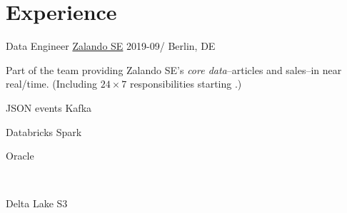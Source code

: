 \documentclass[%
version=last,%
fontsize=11pt,%
paper=A4,%
areasetadvanced,%
headinclude=false,%
footinclude=false,%
headlines=0,%
footlines=0,%
toc=bibnumbered,%
]{scrartcl}
\begin{document}
\begin{minipage}[t]{0.575\textwidth}
  \vspace*{0cm}%
  \section{Experience}%
  \label{sec:experience}

  \WorkEntry%
  {Data Engineer}%
  {\href{https://corporate.zalando.com/en}{Zalando SE}}%
  {2019-09/}%
  {Berlin, DE}%
  {%
    Part of the team providing Zalando SE’s \emph{core data}\---articles and
    sales\---in near real\-/time. (Including \(24 \times 7\) responsibilities
    starting .)%
    \vspace*{20pt}\newline%
    \begingroup%
    \begin{minipage}{.2\linewidth}
      \begin{tcolorbox}[title=Nakadi,remember as=Kafka]
        JSON events%
        \tcblower%
        Kafka
      \end{tcolorbox}
    \end{minipage}%
    \hfill%
    \begin{minipage}{.2\linewidth}
      \begin{tcolorbox}[title=AWS,remember as=Spark]
        Databricks%
        \tcblower%
        Spark
      \end{tcolorbox}%
    \end{minipage}%
    \hfill%
    \begin{minipage}{.2\linewidth}
      \begin{tcolorbox}[remember as=Oracle]
        Oracle
      \end{tcolorbox}%
      \\%
      \begin{tcolorbox}[remember as=S3]
        Delta Lake%
        \tcblower%
        S3
      \end{tcolorbox}
    \end{minipage}%
    \hfill%
    \begin{minipage}{.15\linewidth}

\end{minipage}}
\end{minipage}
\end{document}
